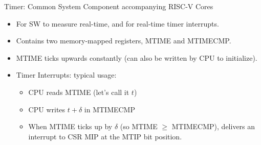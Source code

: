 \documentclass{article}
\begin{document}
\begin{center}
  {\Huge
    Timer: Common System Component accompanying RISC-V Cores}

  \vspace*{0.2in}


  \vspace*{0.3in}

  \begin{minipage}[t]{9in}
    \begin{itemize}\LARGE
    \item For SW to measure real-time, and for real-time timer interrupts.
    \item Contains two memory-mapped registers, MTIME and MTIMECMP.
    \item MTIME ticks upwards constantly (can also be written by CPU to initialize).
    \item Timer Interrupts: typical usage:
      \begin{itemize}
      \item CPU reads MTIME (let's call it $t$)
      \item CPU writes $t + \delta$ in MTIMECMP
      \item When MTIME ticks up by $\delta$ (so MTIME $\geq$
        MTIMECMP), delivers an interrupt to CSR MIP at the MTIP bit position.
      \end{itemize}
    \end{itemize}
  \end{minipage}
\end{center}

\clearpage

\end{document}
